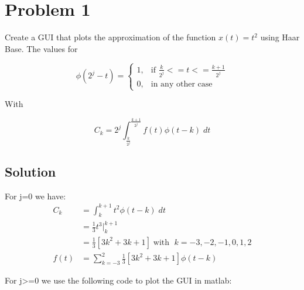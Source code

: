 \section*{Problem 1}
Create a GUI that plots the approximation of the function $x(t) = t^2$ using Haar Base.
The values for 

\begin{equation*}
\phi(2^j-t) = 
\begin{cases}
1, & \text{if } \frac{k}{2^j}<=t<=\frac{k+1}{2^j} \\
0, & \text{in any other case }
\end{cases}
\end{equation*} 

With

\begin{equation*}
C_k = 2^j \int_{\frac{k}{2^j}}^{\frac{k+1}{2^j}} f(t) \phi(t-k) \;dt
\end{equation*} 

\subsection*{Solution}

For j=0 we have:
\begin{equation*}
\begin{aligned}
C_k &= \int_k^{k+1} t^2 \phi(t-k) \;dt \\
&= \frac{1}{3}t^3\bigg|_{k}^{k+1} \\
&= \frac{1}{3} [3k^2+3k+1] \; \text{with } \; k=-3,-2,-1,0,1,2 \\
f(t) &= \displaystyle\sum_{k=-3}^{2} \frac{1}{3} [3k^2+3k+1]\phi(t-k)
\end{aligned}
\end{equation*} 

For j>=0 we use the following code to plot the GUI in matlab:


